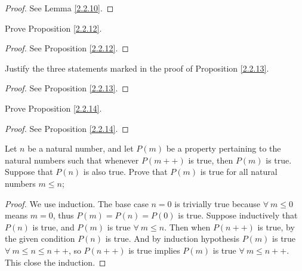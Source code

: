 \begin{proof}
    See Lemma \ref{2.2.10}.
\end{proof}

\begin{exercise}\label{ex 2.2.3}
    Prove Proposition \ref{2.2.12}.
\end{exercise}

\begin{proof}
    See Proposition \ref{2.2.12}.
\end{proof}

\begin{exercise}\label{ex 2.2.4}
    Justify the three statements marked in the proof of Proposition \ref{2.2.13}.
\end{exercise}

\begin{proof}
    See Proposition \ref{2.2.13}.
\end{proof}

\begin{exercise}\label{ex 2.2.5}
    Prove Proposition \ref{2.2.14}.
\end{exercise}

\begin{proof}
    See Proposition \ref{2.2.14}.
\end{proof}

\begin{exercise}\label{ex 2.2.6}
    Let \(n\) be a natural number, and let \(P(m)\) be a property pertaining to the natural numbers such that whenever \(P(m++)\) is true, then \(P(m)\) is true.
    Suppose that \(P(n)\) is also true.
    Prove that \(P(m)\) is true for all natural numbers \(m \leq n\);
\end{exercise}

\begin{proof}
    We use induction.
    The base case \(n = 0\) is trivially true because \(\forall\ m \leq 0\) means \(m = 0\), thus \(P(m) = P(n) = P(0)\) is true.
    Suppose inductively that \(P(n)\) is true, and \(P(m)\) is true \(\forall\ m \leq n\).
    Then when \(P(n++)\) is true, by the given condition \(P(n)\) is true.
    And by induction hypothesis \(P(m)\) is true \(\forall\ m \leq n \leq n++\), so \(P(n++)\) is true implies \(P(m)\) is true \(\forall\ m \leq n++\).
    This close the induction.
\end{proof}